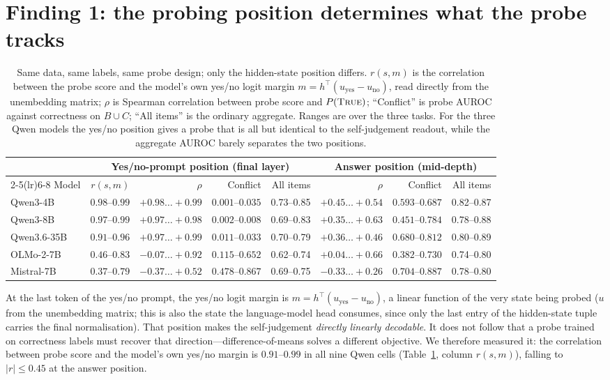 \documentclass[10pt]{article}
\newcommand{\ptrue}{P(\textsc{True})}
\begin{document}
\section{Finding 1: the probing position determines what the probe tracks}
\label{sec:position}

\begin{table}[t]
\centering\footnotesize
\setlength{\tabcolsep}{4pt}
\begin{tabular}{lrrrrrrr}
\toprule
& \multicolumn{4}{c}{Yes/no-prompt position (final layer)} & \multicolumn{3}{c}{Answer position (mid-depth)} \\
\cmidrule(lr){2-5}\cmidrule(lr){6-8}
Model & $r(s,m)$ & $\rho$ & Conflict & All items & $\rho$ & Conflict & All items \\
\midrule
Qwen3-4B    & $0.98$--$0.99$ & $+0.98\ldots{+}0.99$ & $0.001$--$0.035$ & 0.73--0.85 & $+0.45\ldots{+}0.54$ & $0.593$--$0.687$ & 0.82--0.87 \\
Qwen3-8B    & $0.97$--$0.99$ & $+0.97\ldots{+}0.98$ & $0.002$--$0.008$ & 0.69--0.83 & $+0.35\ldots{+}0.63$ & $0.451$--$0.784$ & 0.78--0.88 \\
Qwen3.6-35B & $0.91$--$0.96$ & $+0.97\ldots{+}0.99$ & $0.011$--$0.033$ & 0.70--0.79 & $+0.36\ldots{+}0.46$ & $0.680$--$0.812$ & 0.80--0.89 \\
OLMo-2-7B   & $0.46$--$0.83$ & $-0.07\ldots{+}0.92$ & $0.115$--$0.652$ & 0.62--0.74 & $+0.04\ldots{+}0.66$ & $0.382$--$0.730$ & 0.74--0.80 \\
Mistral-7B  & $0.37$--$0.79$ & $-0.37\ldots{+}0.52$ & $0.478$--$0.867$ & 0.69--0.75 & $-0.33\ldots{+}0.26$ & $0.704$--$0.887$ & 0.78--0.80 \\
\bottomrule
\end{tabular}
\caption{Same data, same labels, same probe design; only the hidden-state position differs.
$r(s,m)$ is the correlation between the probe score and the model's own yes/no logit margin
$m = h^\top(u_{\text{yes}} - u_{\text{no}})$, read directly from the unembedding matrix; $\rho$ is
Spearman correlation between probe score and $\ptrue{}$; ``Conflict'' is probe AUROC against
correctness on $B \cup C$; ``All items'' is the ordinary aggregate. Ranges are over the three tasks.
For the three Qwen models the yes/no position gives a probe that is all but identical to the
self-judgement readout, while the aggregate AUROC barely separates the two positions.}
\label{tab:position}
\end{table}

At the last token of the yes/no prompt, the yes/no logit margin is
$m = h^\top(u_{\text{yes}} - u_{\text{no}})$, a linear function of the very state being probed
($u$ from the unembedding matrix; this is also the state the language-model head consumes, since
only the last entry of the hidden-state tuple carries the final normalisation). That position makes
the self-judgement \emph{directly linearly decodable}. It does not follow that a probe trained on
correctness labels must recover that direction---difference-of-means solves a different objective.
We therefore measured it: the correlation between probe score and the model's own yes/no margin is
$0.91$--$0.99$ in all nine Qwen cells (Table~\ref{tab:position}, column $r(s,m)$), falling to
$|r| \le 0.45$ at the answer position.
\end{document}
